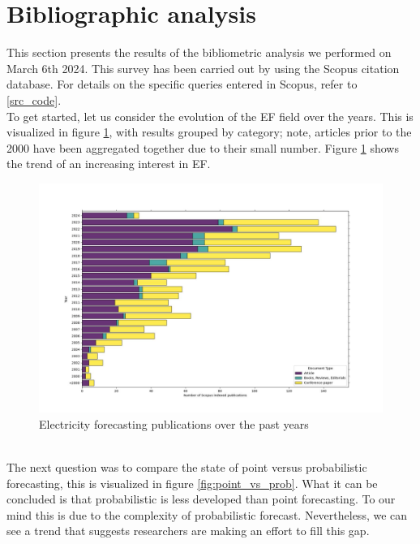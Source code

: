 \section{Bibliographic analysis}
This section presents the results of the bibliometric analysis we performed on March 6th 2024. This survey has been carried out by using the Scopus citation database. For details on the specific queries entered in Scopus, refer to \ref{src_code}.
\\
To get started, let us consider the evolution of the EF field over the years. This is visualized in figure \ref{fig:epf_evolution}, with results grouped by category; note, articles prior to the 2000 have been aggregated together due to their small number. Figure \ref{fig:epf_evolution} shows the trend of an increasing interest in EF.
\begin{figure}
    \includegraphics[width=\textwidth]{images/epf_evolution1.jpg}
    \caption{Electricity forecasting publications over the past years}
    \label{fig:epf_evolution}
  \end{figure}
\\
The next question was to compare the state of point versus probabilistic forecasting, this is visualized in figure \ref{fig:point_vs_prob}. What it can be concluded is that probabilistic is less developed than point forecasting. To our mind this is due to the complexity of probabilistic forecast.
Nevertheless, we can see a trend that suggests researchers are making an effort to fill this gap.
